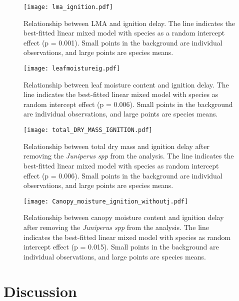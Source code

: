 \documentclass[12pt]{report}
\begin{document}
\begin{figure}
    \centering
    \texttt{[image: lma\_ignition.pdf]}
    \caption{Relationship between LMA and ignition delay. The line indicates the best-fitted linear mixed model with species as a random intercept effect (p = 0.001). Small points in the background are individual observations, and large points are species means.}
\end{figure}



\begin{figure}
    \centering
    \texttt{[image: leafmoistureig.pdf]}
    \caption{Relationship between leaf moisture content and ignition delay. The line indicates the best-fitted linear mixed model with species as random intercept effect (p = 0.006). Small points in the background are individual observations, and large points are species means.}
    \label{fig:my_label}
\end{figure}



\begin{figure}
    \centering
    \texttt{[image: total\_DRY\_MASS\_IGNITION.pdf]}
    \caption{Relationship between total dry mass and ignition delay after removing the \emph{Juniperus spp} from the analysis. The line indicates the best-fitted linear mixed model with species as random intercept effect (p = 0.006). Small points in the background are individual observations, and large points are species means.}
\end{figure}

\begin{figure}
    \centering
    \texttt{[image: Canopy\_moisture\_ignition\_withoutj.pdf]}
    \caption{Relationship between canopy moisture content and ignition delay after removing the \emph{Juniperus spp} from the analysis. The line indicates the best-fitted linear mixed model with species as random intercept effect (p = 0.015). Small points in the background are individual observations, and large points are species means.}

\end{figure}


\section{Discussion}
\end{document}
